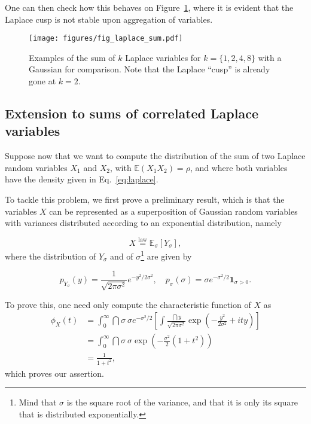One can then check how this behaves on Figure~\ref{fig:lap_sum}, where it is evident that the Laplace cusp is not stable upon aggregation of variables. 

\begin{figure}[tb]
    \centering
    \texttt{[image: figures/fig\_laplace\_sum.pdf]}
    \caption{Examples of the sum of $k$ Laplace variables for $k=\{1,2,4,8\}$ with a Gaussian for comparison. Note that the Laplace ``cusp'' is already gone at $k=2$.}
    \label{fig:lap_sum}
\end{figure}

\subsection{Extension to sums of correlated Laplace variables} %
\label{sub:extension_to_sums_of_correlated_laplace_variables}
Suppose now that we want to compute the distribution of the sum of two Laplace random variables $X_1$ and $X_2$, with $\mathbb{E}(X_1X_2)=\rho$, and where both variables have the density given in Eq.~\eqref{eq:laplace}.

To tackle this problem, we first prove a preliminary result, which is that the variables $X$ can be represented as a superposition of Gaussian random variables with variances distributed according to an exponential distribution, namely

\begin{equation}\label{eq:lap_super}
X \overset{\text{law}}{=} \mathbb{E}_{\sigma}\left[Y_{\sigma}\right] ,
\end{equation}
where the distribution of $Y_{\sigma}$ and of $\sigma$\footnote{Mind that $\sigma$ is the square root of the variance, and that it is only its square that is distributed exponentially.} are given by

\begin{equation}\label{eq:densities}
p_{Y_{\sigma}}(y) = \frac{1}{\sqrt{2\pi\sigma^2}} e^{-y^2/2\sigma^2},\quad p_{\sigma}(\sigma)= \sigma e^{-\sigma^2/2}\mathbf{1}_{\sigma>0}.
\end{equation}

To prove this, one need only compute the characteristic function of $X$ as
\begin{equation}\label{eq:characteristic_function_superp}
\begin{split}
\phi_{X}(t) &= \int_{0}^\infty\dint \sigma ~ \sigma e^{-\sigma^2/2}\left[\int \frac{\dint y}{\sqrt{2\pi \sigma^2}}\exp\left(-\frac{y^2}{2\sigma^2}+ity\right)\right]\\
&=\int_{0}^\infty\dint \sigma~ \sigma \exp\left(-\frac{\sigma^2}{2}\left(1+t^2\right)\right)\\
&= \frac{1}{1+t^2},
\end{split}
\end{equation}
which proves our assertion.

